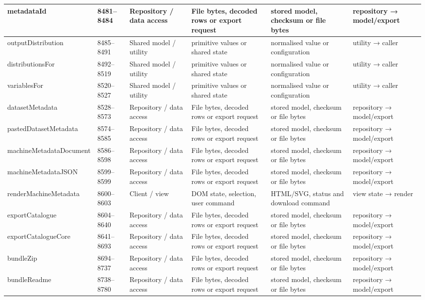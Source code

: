 \begin{landscape}
\begin{longtable}{@{}p{3.2cm}p{1.45cm}p{2.7cm}p{4.0cm}p{4.0cm}p{3.0cm}@{}}
metadataId & 8481--8484 & Repository / data access & File bytes, decoded rows or export request & stored model, checksum or file bytes & repository → model/export \\\hline
outputDistribution & 8485--8491 & Shared model / utility & primitive values or shared state & normalised value or configuration & utility → caller \\\hline
distributionsFor & 8492--8519 & Shared model / utility & primitive values or shared state & normalised value or configuration & utility → caller \\\hline
variablesFor & 8520--8527 & Shared model / utility & primitive values or shared state & normalised value or configuration & utility → caller \\\hline
datasetMetadata & 8528--8573 & Repository / data access & File bytes, decoded rows or export request & stored model, checksum or file bytes & repository → model/export \\\hline
pastedDatasetMetadata & 8574--8585 & Repository / data access & File bytes, decoded rows or export request & stored model, checksum or file bytes & repository → model/export \\\hline
machineMetadataDocument & 8586--8598 & Repository / data access & File bytes, decoded rows or export request & stored model, checksum or file bytes & repository → model/export \\\hline
machineMetadataJSON & 8599--8599 & Repository / data access & File bytes, decoded rows or export request & stored model, checksum or file bytes & repository → model/export \\\hline
renderMachineMetadata & 8600--8603 & Client / view & DOM state, selection, user command & HTML/SVG, status and download command & view state → render \\\hline
exportCatalogue & 8604--8640 & Repository / data access & File bytes, decoded rows or export request & stored model, checksum or file bytes & repository → model/export \\\hline
exportCatalogueCore & 8641--8693 & Repository / data access & File bytes, decoded rows or export request & stored model, checksum or file bytes & repository → model/export \\\hline
bundleZip & 8694--8737 & Repository / data access & File bytes, decoded rows or export request & stored model, checksum or file bytes & repository → model/export \\\hline
bundleReadme & 8738--8780 & Repository / data access & File bytes, decoded rows or export request & stored model, checksum or file bytes & repository → model/export \\\hline

\end{longtable}
\end{landscape}

